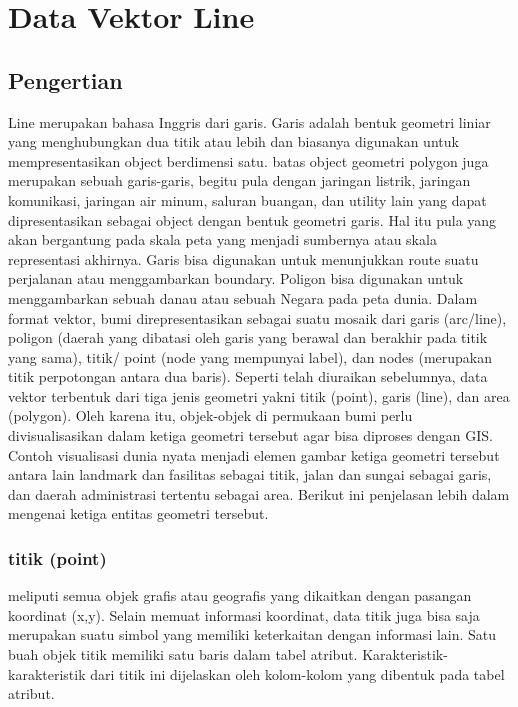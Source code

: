 \section{Data Vektor Line}
\subsection{Pengertian}
  Line merupakan bahasa Inggris dari garis. Garis adalah bentuk geometri liniar yang
 menghubungkan dua titik atau lebih dan biasanya digunakan untuk mempresentasikan
 object berdimensi satu. batas object geometri polygon juga merupakan sebuah garis-garis,
 begitu pula dengan jaringan listrik, jaringan komunikasi, jaringan air minum, saluran buangan,
 dan utility lain yang dapat dipresentasikan sebagai object dengan bentuk geometri garis.
 Hal itu pula yang akan bergantung pada skala peta yang menjadi sumbernya atau skala
 representasi akhirnya.
  Garis bisa digunakan untuk menunjukkan route suatu perjalanan atau menggambarkan boundary. 
 Poligon bisa digunakan untuk menggambarkan sebuah danau atau sebuah Negara pada peta dunia. 
 Dalam format vektor, bumi direpresentasikan sebagai suatu mosaik dari garis (arc/line), 
 poligon (daerah yang dibatasi oleh garis yang berawal dan berakhir pada titik yang sama), 
 titik/ point (node yang mempunyai label), dan nodes (merupakan titik perpotongan antara dua baris).
  Seperti telah diuraikan sebelumnya, data vektor terbentuk dari tiga jenis geometri yakni 
 titik (point), garis (line), dan area (polygon). 
 Oleh karena itu, objek-objek di permukaan bumi perlu divisualisasikan 
 dalam ketiga geometri tersebut agar bisa diproses dengan GIS. 
 Contoh visualisasi dunia nyata menjadi elemen gambar ketiga geometri tersebut antara lain landmark dan fasilitas sebagai titik, 
 jalan dan sungai sebagai garis, dan daerah administrasi tertentu sebagai area. 
 Berikut ini penjelasan lebih dalam mengenai ketiga entitas geometri tersebut.
 
 \subsubsection{titik (point)}
  meliputi semua objek grafis atau geografis yang dikaitkan dengan pasangan koordinat (x,y). 
  Selain memuat informasi koordinat, data  titik juga bisa saja merupakan suatu simbol yang memiliki 
  keterkaitan dengan informasi lain.  Satu buah objek titik memiliki satu baris dalam tabel atribut. 
  Karakteristik-karakteristik dari titik ini dijelaskan oleh kolom-kolom yang dibentuk pada tabel atribut.
  

